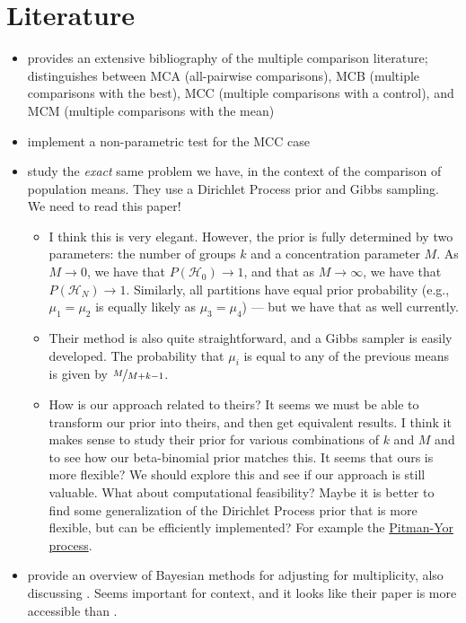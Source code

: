 \documentclass[]{article}
\begin{document}
\section{Literature}
\begin{itemize}
    \item \textcite{rao2009multiple} provides an extensive bibliography of the multiple comparison literature; distinguishes between MCA (all-pairwise comparisons), MCB (multiple comparisons with the best), MCC (multiple comparisons with a control), and MCM (multiple comparisons with the mean)
    \item \textcite{gutierrez2019bayesian} implement a non-parametric test for the MCC case
    \item \textcite{gopalan1998bayesian} study the \textit{exact} same problem we have, in the context of the comparison of population means. They use a Dirichlet Process prior and Gibbs sampling. We need to read this paper!
    \begin{itemize}
        \item I think this is very elegant. However, the prior is fully determined by two parameters: the number of groups $k$ and a concentration parameter $M$. As $M \rightarrow 0$, we have that $P(\mathcal{H}_0) \rightarrow 1$, and that as $M \rightarrow \infty$, we have that $P(\mathcal{H}_N) \rightarrow 1$. Similarly, all partitions have equal prior probability (e.g., $\mu_1 = \mu_2$ is equally likely as $\mu_3 = \mu_4$) --- but we have that as well currently.
        \item Their method is also quite straightforward, and a Gibbs sampler is easily developed. The probability that $\mu_i$ is equal to any of the previous means is given by $\nicefrac{M}{M + k - 1}$.
        \item How is our approach related to theirs? It seems we must be able to transform our prior into theirs, and then get equivalent results. I think it makes sense to study their prior for various combinations of $k$ and $M$ and to see how our beta-binomial prior matches this. It seems that ours is more flexible? We should explore this and see if our approach is still valuable. What about computational feasibility? Maybe it is better to find some generalization of the Dirichlet Process prior that is more flexible, but can be efficiently implemented? For example the \href{https://en.wikipedia.org/wiki/Pitman\%E2\%80\%93Yor\_process}{Pitman-Yor process}.
    \end{itemize}
    \item \textcite{berry1999bayesian} provide an overview of Bayesian methods for adjusting for multiplicity, also discussing \textcite{gopalan1998bayesian}. Seems important for context, and it looks like their paper is more accessible than \textcite{gopalan1998bayesian}.

\end{itemize}
\end{document}
